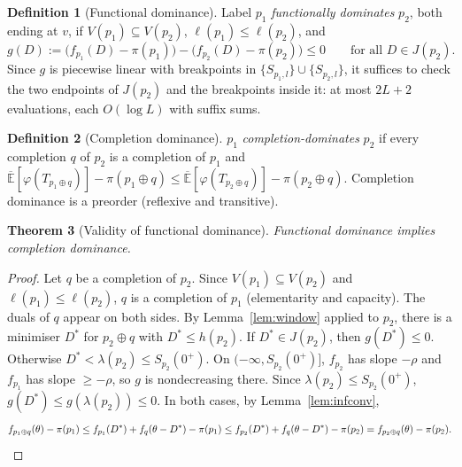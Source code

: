 \documentclass[11pt]{article}
\newtheorem{theorem}{Theorem}[section]
\theoremstyle{definition}
\newtheorem{definition}[theorem]{Definition}
\newcommand{\Eu}{\overline{\mathbb{E}}}
\begin{document}
\begin{definition}[Functional dominance]\label{def:fdom}
Label $p_1$ \emph{functionally dominates} $p_2$, both ending at $v$, if $V(p_1)\subseteq V(p_2)$, $\ell(p_1)\le\ell(p_2)$, and
\[
g(D):=\big(f_{p_1}(D)-\pi(p_1)\big)-\big(f_{p_2}(D)-\pi(p_2)\big)\le0\qquad\text{for all } D\in J(p_2).
\]
Since $g$ is piecewise linear with breakpoints in $\{S_{p_1,l}\}\cup\{S_{p_2,l}\}$, it suffices to check the two endpoints of $J(p_2)$ and the breakpoints inside it: at most $2L+2$ evaluations, each $O(\log L)$ with suffix sums.
\end{definition}

\begin{definition}[Completion dominance]
$p_1$ \emph{completion-dominates} $p_2$ if every completion $q$ of $p_2$ is a completion of $p_1$ and
$\Eu[\varphi(T_{p_1\oplus q})]-\pi(p_1\oplus q)\le\Eu[\varphi(T_{p_2\oplus q})]-\pi(p_2\oplus q)$.
Completion dominance is a preorder (reflexive and transitive).
\end{definition}

\begin{theorem}[Validity of functional dominance]\label{thm:fdom}
Functional dominance implies completion dominance.
\end{theorem}
\begin{proof}
Let $q$ be a completion of $p_2$. Since $V(p_1)\subseteq V(p_2)$ and $\ell(p_1)\le\ell(p_2)$, $q$ is a completion of $p_1$ (elementarity and capacity). The duals of $q$ appear on both sides. By Lemma~\ref{lem:window} applied to $p_2$, there is a minimiser $D^*$ for $p_2\oplus q$ with $D^*\le h(p_2)$.
If $D^*\in J(p_2)$, then $g(D^*)\le0$.
Otherwise $D^*<\lambda(p_2)\le S_{p_2}(0^+)$. On $(-\infty,S_{p_2}(0^+)]$, $f_{p_2}$ has slope $-\rho$ and $f_{p_1}$ has slope $\ge-\rho$, so $g$ is nondecreasing there. Since $\lambda(p_2)\le S_{p_2}(0^+)$, $g(D^*)\le g(\lambda(p_2))\le0$.
In both cases, by Lemma~\ref{lem:infconv},
\[
f_{p_1\oplus q}(\theta)-\pi(p_1)\le f_{p_1}(D^*)+f_q(\theta-D^*)-\pi(p_1)\le f_{p_2}(D^*)+f_q(\theta-D^*)-\pi(p_2)=f_{p_2\oplus q}(\theta)-\pi(p_2).\qedhere
\]
\end{proof}
\end{document}
